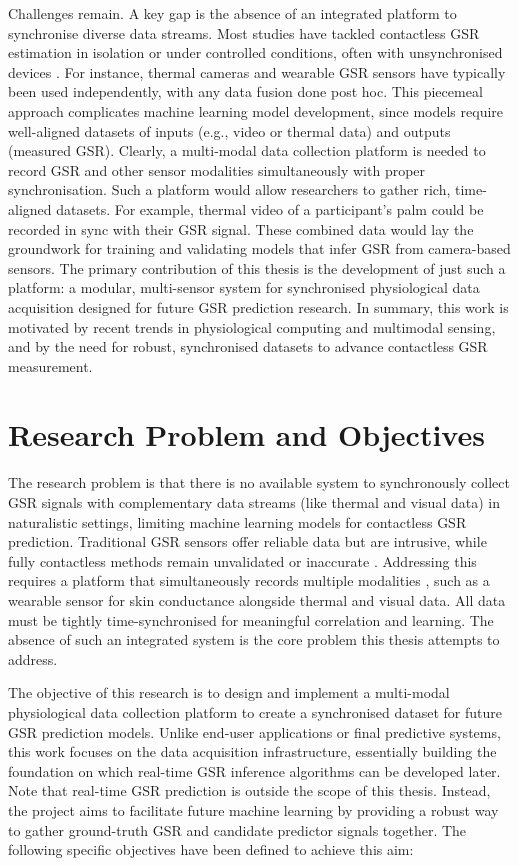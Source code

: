 Challenges remain. A key gap is the absence of an integrated platform to synchronise diverse data streams. Most studies have tackled contactless GSR estimation in isolation or under controlled conditions, often with unsynchronised devices \cite{ref7}. For instance, thermal cameras and wearable GSR sensors have typically been used independently, with any data fusion done post hoc. This piecemeal approach complicates machine learning model development, since models require well-aligned datasets of inputs (e.g., video or thermal data) and outputs (measured GSR). Clearly, a multi-modal data collection platform is needed to record GSR and other sensor modalities simultaneously with proper synchronisation. Such a platform would allow researchers to gather rich, time-aligned datasets. For example, thermal video of a participant's palm could be recorded in sync with their GSR signal. These combined data would lay the groundwork for training and validating models that infer GSR from camera-based sensors. The primary contribution of this thesis is the development of just such a platform: a modular, multi-sensor system for synchronised physiological data acquisition designed for future GSR prediction research. In summary, this work is motivated by recent trends in physiological computing and multimodal sensing, and by the need for robust, synchronised datasets to advance contactless GSR measurement.

\section{Research Problem and Objectives}
The research problem is that there is no available system to synchronously collect GSR signals with complementary data streams (like thermal and visual data) in naturalistic settings, limiting machine learning models for contactless GSR prediction. Traditional GSR sensors offer reliable data but are intrusive, while fully contactless methods remain unvalidated or inaccurate \cite{ref8}. Addressing this requires a platform that simultaneously records multiple modalities \textemdash, such as a wearable sensor for skin conductance alongside thermal and visual data. All data must be tightly time-synchronised for meaningful correlation and learning. The absence of such an integrated system is the core problem this thesis attempts to address.

The objective of this research is to design and implement a multi-modal physiological data collection platform to create a synchronised dataset for future GSR prediction models. Unlike end-user applications or final predictive systems, this work focuses on the data acquisition infrastructure, essentially building the foundation on which real-time GSR inference algorithms can be developed later. Note that real-time GSR prediction is outside the scope of this thesis. Instead, the project aims to facilitate future machine learning by providing a robust way to gather ground-truth GSR and candidate predictor signals together. The following specific objectives have been defined to achieve this aim:

